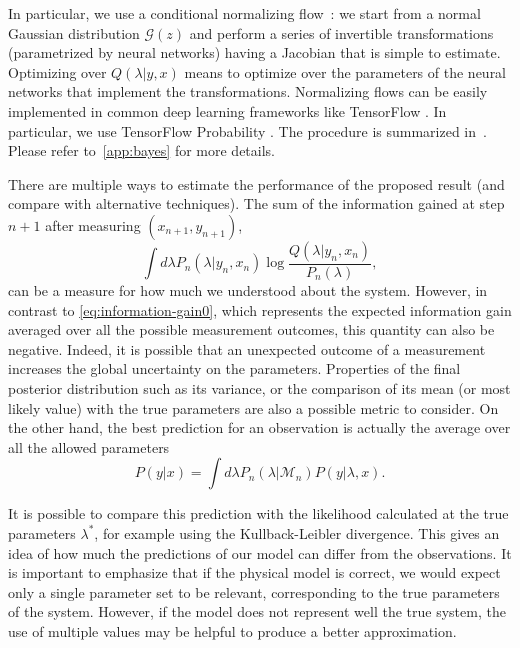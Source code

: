 \documentclass[10pt]{iopart}  %
\begin{document}
In particular, we use a conditional normalizing flow~\cite{winkler_learning_2019}: we start from a normal Gaussian distribution $\mathcal{G}(z)$ and perform a series of invertible transformations (parametrized by neural networks) having a Jacobian that is simple to estimate.
Optimizing over $Q(\lambda|y,x)$ means to optimize over the parameters of the neural networks that implement the transformations.
Normalizing flows can be easily implemented in common deep learning frameworks like TensorFlow \cite{martin_abadi_tensorflow_2015}.
In particular, we use TensorFlow Probability \cite{dillon_tensorflow_2017}.
The procedure is summarized in~.
Please refer to~\ref{app:bayes} for more details.

There are multiple ways to estimate the performance of the proposed result (and compare with alternative techniques).
The sum of the information gained at step $n+1$ after measuring $(x_{n+1},y_{n+1})$,
\begin{equation}
    \int d\lambda P_n(\lambda|y_n, x_n) \log\frac{Q(\lambda|y_n,x_n)}{P_n(\lambda)},
\end{equation}
can be a measure for how much we understood about the system.
However, in contrast to \eqref{eq:information-gain0}, which represents the expected information gain averaged over all the possible measurement outcomes, this quantity can also be negative. Indeed, it is possible that an unexpected outcome of a measurement increases the global uncertainty on the parameters.
Properties of the final posterior distribution such as its variance, or the comparison of its mean (or most likely value) with the true parameters are also a possible metric to consider.
On the other hand, the best prediction for an observation is actually the average over all the allowed parameters
\begin{equation}
    P(y|x) = \int d\lambda P_n(\lambda |\mathcal{M}_n) P(y|\lambda,x).
\end{equation}

It is possible to compare this prediction with the likelihood calculated at the true parameters $\lambda^*$, for example using the Kullback-Leibler divergence.
This gives an idea of how much the predictions of our model can differ from the observations.
It is important to emphasize that if the physical model is correct, we would expect only a single parameter set to be relevant, corresponding to the true parameters of the system.
However, if the model does not represent well the true system, the use of multiple values may be helpful to produce a better approximation.
\end{document}
